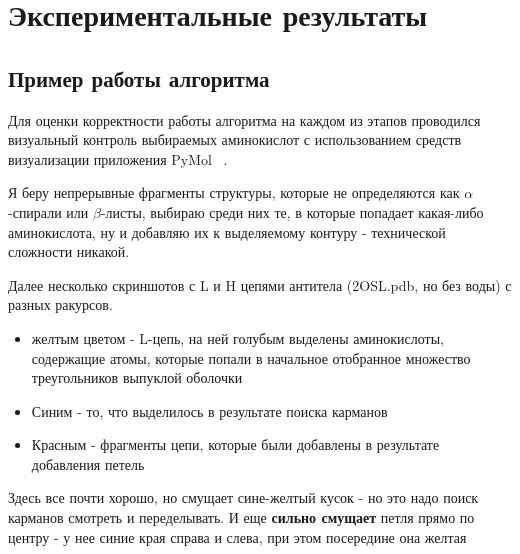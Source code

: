 \graphicspath{{../images/algorithm/}}
\chapter{Экспериментальные результаты}
\section{Пример работы алгоритма}
Для оценки корректности работы алгоритма на каждом из этапов проводился визуальный контроль выбираемых аминокислот с использованием средств визуализации приложения PyMol ~\cite{pymol}.

Я беру непрерывные фрагменты структуры, которые не определяются как $\alpha$-спирали или $\beta$-листы, выбираю среди них те, в которые попадает какая-либо аминокислота, ну и добавляю их к выделяемому контуру - технической сложности никакой.

Далее несколько скриншотов с L и H цепями антитела (2OSL.pdb, но без воды) с разных ракурсов.
\begin{itemize}

\item желтым цветом - L-цепь, на ней голубым выделены аминокислоты, содержащие атомы, которые попали в начальное отобранное множество треугольников выпуклой оболочки

\item Синим - то, что выделилось в результате поиска карманов

\item Красным - фрагменты цепи, которые были добавлены в результате добавления петель

\end{itemize}

Здесь все почти хорошо, но смущает сине-желтый кусок - но это надо поиск карманов смотреть и переделывать. И еще \textbf{сильно смущает} петля прямо по центру - у нее синие края справа и слева, при этом посередине она желтая


